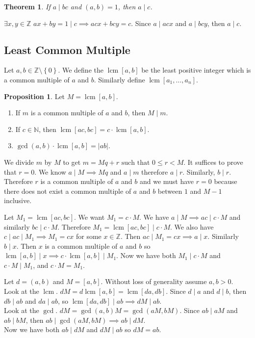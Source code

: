 \documentclass[11pt]{article}
\newtheorem{thm}{Theorem}[section]
\theoremstyle{definition}
\newtheorem{prop}{Proposition}[section]
\newcommand{\The}[2]{\begin{#1}#2\end{#1}}
\newcommand{\sm}[0]{\setminus}
\newcommand{\set}[1]{\left\{ #1 \right\}}
\newcommand{\srng}[3]{#1_#2,\dots,#1_#3}
\newcommand{\st}[0]{\text{ such that }}
\newcommand{\abs}[1]{\left\lvert#1\right\rvert} %
\DeclareMathOperator{\lcm}{lcm}
\newcommand{\ZZ}{\mathbb{Z}}
\newcommand{\NN}{\mathbb{N}}
\begin{document}
\begin{thm}
If $a\mid bc$ and $(a,b)=1$, then $a\mid c$.
\end{thm}
\proof $\exists x,y\in\ZZ$ \st $ax+by=1\mid c \implies acx+bcy=c$. Since $a\mid acx$ and $a\mid bcy$, then $a\mid c$. 
\qedhere

\subsection{Least Common Multiple}
\The {defn} {
	Let $a,b\in\ZZ\sm\set{0}$. We define the $\lcm[a,b]$ be the least positive integer which is a common multiple of $a$ and $b$. Similarly define $\lcm[\srng{a}{1}{n}]$.
}

\begin{prop} Let $M=\lcm[a,b]$. 
\begin{enumerate}
	\item If $m$ is a common multiple of $a$ and $b$, then $M\mid m$.
	\item If $c\in\NN$, then $\lcm[ac,bc] = c\cdot\lcm[a,b]$.
	\item $\gcd(a,b)\cdot\lcm[a,b] = \abs{ab}$.
\end{enumerate}
\end{prop}

\proof[Proof of 1.] We divide $m$ by $M$ to get $m = Mq + r \st 0 \le r < M$. It suffices to prove that $r=0$. We know $a\mid M \implies Mq$ and $a\mid m$ therefore $a\mid r$. Similarly, $b\mid r$. Therefore $r$ is a common multiple of $a$ and $b$ and we must have $r=0$ because there does not exist a common multiple of $a$ and $b$ between $1$ and $M-1$ inclusive.
\qedhere

\proof[Proof of 2.] Let $M_1 = \lcm[ac,bc]$. We want $M_1 = c\cdot M$. We have $a\mid M \implies ac\mid c\cdot M$ and similarly $bc\mid c\cdot M$. Therefore $M_1 = \lcm[ac,bc]\mid c\cdot M$. 
We also have $c\mid ac\mid M_1 \implies M_1 = cx$ for some $x\in\ZZ$. Then $ac\mid M_1 = cx \implies a\mid x$. Similarly $b\mid x$. 
Then $x$ is a common multiple of $a$ and $b$ so $\lcm[a,b]\mid x \implies c\cdot\lcm[a,b]\mid M_1$. 
Now we have both $M_1\mid c\cdot M$ and $c\cdot M\mid M_1$, and $c\cdot M = M_1$.
\qedhere

\proof[Proof of 3.] Let $d = (a,b)$ and $M = [a,b]$. Without loss of generality assume $a,b>0$. 
\\Look at the $\lcm$. $dM = d\lcm[a,b] = \lcm[da,db]$. Since $d\mid a$ and $d\mid b$, then $db\mid ab$ and $da\mid ab$, so $\lcm[da,db] \mid ab \implies dM\mid ab$. 
\\Look at the $\gcd$. $dM = \gcd(a,b)M = \gcd(aM,bM)$. Since $ab\mid aM$ and $ab\mid bM$, then $ab\mid \gcd(aM,bM) \implies ab\mid dM$. 
\\ Now we have both $ab\mid dM$ and $dM\mid ab$ so $dM = ab$.
\qedhere
\end{document}

